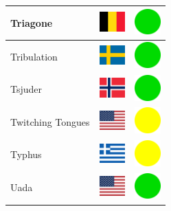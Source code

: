 \documentclass[12pt, a4paper, twoside]{report}
\begin{document}
\begin{center}
\begin{longtable}{|p{5cm}|p{2cm}|p{2cm}|}
 Triagone                                                   & \includegraphics[width=1cm]{../4x3/be} &   \includegraphics[width=1cm]{../likes/y} \\ \hline
 Tribulation                                                & \includegraphics[width=1cm]{../4x3/se} &   \includegraphics[width=1cm]{../likes/y} \\ \hline
 Tsjuder                                                    & \includegraphics[width=1cm]{../4x3/no} &   \includegraphics[width=1cm]{../likes/y} \\ \hline
 Twitching Tongues                                          & \includegraphics[width=1cm]{../4x3/us} &   \includegraphics[width=1cm]{../likes/m} \\ \hline
 Typhus                                                     & \includegraphics[width=1cm]{../4x3/gr} &   \includegraphics[width=1cm]{../likes/m} \\ \hline
 Uada                                                       & \includegraphics[width=1cm]{../4x3/us} &   \includegraphics[width=1cm]{../likes/y} \\ \hline

\end{longtable}
\end{center}
\end{document}
